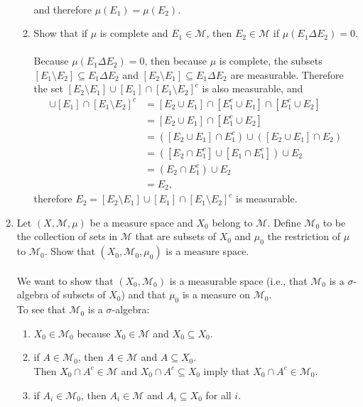 \begin{enumerate}
\begin{enumerate}[label=(\roman*),align=left]
\begin{align*}
		\end{align*}
		and therefore $\mu(E_1)=\mu(E_2)$.
		\item Show that if $\mu$ is complete and $E_1\in\mathcal{M}$, then $E_2\in\mathcal{M}$ if $\mu(E_1\Delta E_2)=0$.\\
		\\Because $\mu(E_1\Delta E_2)=0$, then because $\mu$ is complete, the subsets $[E_1\setminus E_2]\subseteq E_1\Delta E_2$ and $[E_2\setminus E_1]\subseteq E_1\Delta E_2$ are measurable.
		Therefore the set $[E_2\setminus E_1]\cup[E_1]\cap[E_1\setminus E_2]^c$ is also measurable, and
		\begin{align*}
			[E_2\setminus E_1]\cup[E_1]\cap[E_1\setminus E_2]^c&=[E_2\cup E_1]\cap[E_1^c\cup E_1]\cap[E_1^c\cup E_2]\\
			&=[E_2\cup E_1]\cap[E_1^c\cup E_2]\\
			&=([E_2\cup E_1]\cap E_1^c)\cup ([E_2\cup E_1]\cap E_2)\\
			&=([E_2\cap E_1^c]\cup [E_1\cap E_1^c])\cup E_2\\
			&=(E_2\cap E_1^c)\cup E_2\\
			&=E_2,
		\end{align*}
		therefore $E_2=[E_2\setminus E_1]\cup[E_1]\cap[E_1\setminus E_2]^c$ is measurable.
	\end{enumerate}
	\item Let $(X,\mathcal{M},\mu)$ be a measure space and $X_0$ belong to $\mathcal{M}$.
	Define $\mathcal{M}_0$ to be the collection of sets in $\mathcal{M}$ that are subsets of $X_0$ and $\mu_0$ the restriction of $\mu$ to $\mathcal{M}_0$.
	Show that $(X_0,\mathcal{M}_0,\mu_0)$ is a measure space.\\
	\\We want to show that $(X_0,\mathcal{M}_0)$ is a measurable space (i.e., that $\mathcal{M}_0$ is a $\sigma$-algebra of subsets of $X_0$) and that $\mu_0$ is a measure on $\mathcal{M}_0$.
	\\To see that $\mathcal{M}_0$ is a $\sigma$-algebra:
	\begin{enumerate}[label=(\roman*),align=left]   
		\item $X_0\in\mathcal{M}_0$ because $X_0\in\mathcal{M}$ and $X_0\subseteq X_0$.
		\item if $A\in\mathcal{M}_0$, then $A\in\mathcal{M}$ and $A\subseteq X_0$.\\
		Then $X_0\cap A^c\in\mathcal{M}$ and $X_0\cap A^c\subseteq X_0$ imply that $X_0\cap A^c\in\mathcal{M}_0$.
		\item if $A_i\in\mathcal{M}_0$, then $A_i\in\mathcal{M}$ and $A_i\subseteq X_0$ for all $i$.\\

\end{enumerate}
\end{enumerate}
